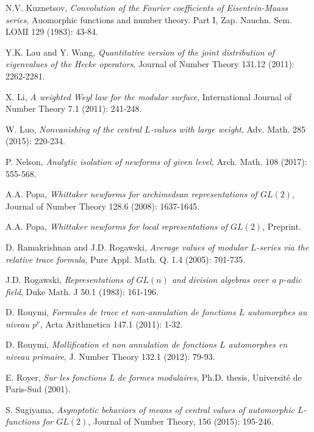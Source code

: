 \documentclass[11pt,reqno]{amsart}
\theoremstyle{definition}
\begin{document}
\begin{thebibliography}{100}
 N.V. Kuznetsov, {\it Convolution of the Fourier coefficients of Eisentein-Maass series}, Auomorphic functions and number theory. Part I, Zap. Nauchn. Sem. LOMI 129 (1983): 43-84.

Y.K. Lau and Y. Wang, {\it Quantitative version of the joint distribution of eigenvalues of the Hecke operators}, Journal of Number Theory 131.12 (2011): 2262-2281.

X. Li, {\it A weighted Weyl law for the modular surface},
International Journal of Number Theory 7.1 (2011): 241-248.




W. Luo, {\it Nonvanishing of the central $L$-values with large weight},
Adv. Math. 285 (2015): 220-234.

 P. Nelson,
{\it Analytic isolation of newforms of given level}, Arch. Math. 108 (2017): 555-568.

A.A. Popa, {\it
Whittaker newforms for archimedean representations of $GL(2)$},
Journal of Number Theory 128.6 (2008): 1637-1645.

A.A. Popa, {\it
 Whittaker newforms for local representations of $GL(2)$}, Preprint.

D. Ramakrishnan and J.D. Rogawski, {\it Average values of
modular $L$-series via the relative trace formula},
Pure Appl. Math. Q. 1.4 (2005): 701-735.


J.D. Rogawski, {\it Representations of $GL(n)$ and division algebras
over a $p$-adic field}, Duke Math. J 50.1 (1983): 161-196.



D. Rouymi, {\it Formules de trace et non-annulation de fonctions $L$ automorphes au niveau $p^\nu$}, Acta Arithmetica 147.1 (2011): 1-32.

 D. Rouymi, {\it Mollification et non annulation de fonctions $L$ automorphes en niveau primaire},
    J. Number Theory 132.1 (2012): 79-93.


 E. Royer, {\it Sur les fonctions L de formes modulaires}, Ph.D. thesis, Universit\'{e} de Paris-Sud (2001).

S. Sugiyama,
{\it Asymptotic behaviors of means of central values of automorphic $L$-functions for $GL(2)$},
Journal of Number Theory, 156 (2015): 195-246.


\end{thebibliography}
\end{document}
